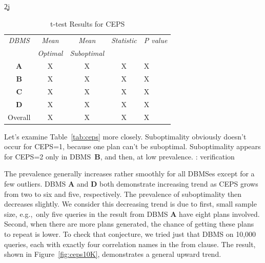 \c2j{}{\begin{table}[t]
\begin{center}
\begin{tabular}{c|c|c|c|l}
{\em DBMS} & {\em Mean} & {\em Mean} & {\em Statistic} &
{\em P value} \\
&{\em Optimal} & {\em Suboptimal} &\\
\hline
{\bf A} & X & X & X & X\\
{\bf B} & X & X & X & X\\
{\bf C} & X & X & X & X\\
{\bf D} & X & X & X & X\\
Overall & X & X & X & X\\
\end{tabular}

\end{center}
\caption{t-test Results for CEPS\label{tab:ttests}}
\end{table}


Let's examine Table~\ref{tab:ceps} more closely. Suboptimality obviously
doesn't occur for CEPS=1, because one plan can't be suboptimal. Suboptimality
appears for CEPS=2 only in DBMS~{\bf B}, and then, at low prevalence.
{\todo: verification}

The prevalence generally increases rather smoothly for all DBMSes
except for a few outliers. DBMS {\bf A} and {\bf D} both demonstrate increasing trend as
CEPS grows from two to six and five, respectively. The prevalence of 
suboptimality then decreases slightly. We consider this decreasing trend is due to first, 
small sample size, e.g.,~only five queries in the result from DBMS {\bf A} 
have eight plans involved. Second, when there are more plans generated, the 
chance of getting these plans to repeat is lower. To check that conjecture, we tried
just that DBMS on 10,000 queries, each with exactly four correlation names in the from
clause. The result, shown in Figure~\ref{fig:ceps10K}, demonstrates a general upward trend.
}
